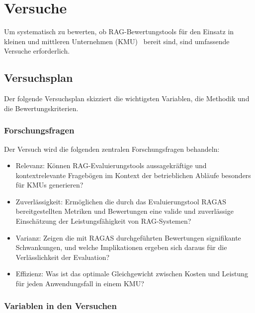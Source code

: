 \chapter{Versuche}

Um systematisch zu bewerten, ob RAG-Bewertungstools für den Einsatz in kleinen und mittleren Unternehmen (KMU)~\cite{esf_kmu_2025} bereit sind, sind umfassende Versuche erforderlich.

\section{Versuchsplan}
Der folgende Versuchsplan skizziert die wichtigsten Variablen, die Methodik und die Bewertungskriterien.

\subsection{Forschungsfragen}\label{subsec:forschungsfragen}

Der Versuch wird die folgenden zentralen Forschungsfragen behandeln:

\begin{itemize}
    \item Relevanz: Können RAG-Evaluierungstools aussagekräftige und kontextrelevante Fragebögen im Kontext der betrieblichen Abläufe besonders für KMUs generieren?
    \item Zuverlässigkeit: Ermöglichen die durch das Evaluierungstool RAGAS bereitgestellten Metriken und Bewertungen eine valide und zuverlässige Einschätzung der Leistungsfähigkeit von RAG-Systemen?
    \item Varianz: Zeigen die mit RAGAS durchgeführten Bewertungen signifikante Schwankungen, und welche Implikationen ergeben sich daraus für die Verlässlichkeit der Evaluation?
    \item Effizienz: Was ist das optimale Gleichgewicht zwischen Kosten und Leistung für jeden Anwendungsfall in einem KMU?
\end{itemize}

\subsection{Variablen in den Versuchen}

